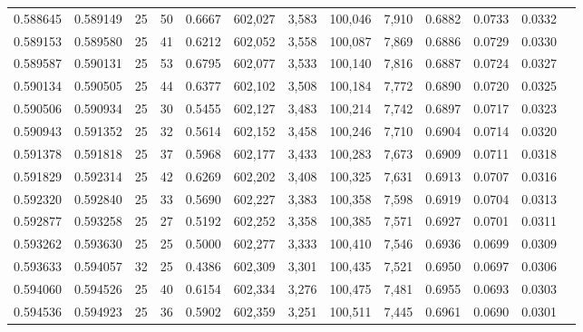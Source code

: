 \begin{tabular}{rrrrrrrrrrrrr}
0.588645 & 0.589149 &    25 &  50 &                                     0.6667 & 602,027 &   3,583 & 100,046 &   7,910 & 0.6882 & 0.0733 & 0.0332 \\
0.589153 & 0.589580 &    25 &  41 &                                     0.6212 & 602,052 &   3,558 & 100,087 &   7,869 & 0.6886 & 0.0729 & 0.0330 \\
0.589587 & 0.590131 &    25 &  53 &                                     0.6795 & 602,077 &   3,533 & 100,140 &   7,816 & 0.6887 & 0.0724 & 0.0327 \\
0.590134 & 0.590505 &    25 &  44 &                                     0.6377 & 602,102 &   3,508 & 100,184 &   7,772 & 0.6890 & 0.0720 & 0.0325 \\
0.590506 & 0.590934 &    25 &  30 &                                     0.5455 & 602,127 &   3,483 & 100,214 &   7,742 & 0.6897 & 0.0717 & 0.0323 \\
0.590943 & 0.591352 &    25 &  32 &                                     0.5614 & 602,152 &   3,458 & 100,246 &   7,710 & 0.6904 & 0.0714 & 0.0320 \\
0.591378 & 0.591818 &    25 &  37 &                                     0.5968 & 602,177 &   3,433 & 100,283 &   7,673 & 0.6909 & 0.0711 & 0.0318 \\
0.591829 & 0.592314 &    25 &  42 &                                     0.6269 & 602,202 &   3,408 & 100,325 &   7,631 & 0.6913 & 0.0707 & 0.0316 \\
0.592320 & 0.592840 &    25 &  33 &                                     0.5690 & 602,227 &   3,383 & 100,358 &   7,598 & 0.6919 & 0.0704 & 0.0313 \\
0.592877 & 0.593258 &    25 &  27 &                                     0.5192 & 602,252 &   3,358 & 100,385 &   7,571 & 0.6927 & 0.0701 & 0.0311 \\
0.593262 & 0.593630 &    25 &  25 &                                     0.5000 & 602,277 &   3,333 & 100,410 &   7,546 & 0.6936 & 0.0699 & 0.0309 \\
0.593633 & 0.594057 &    32 &  25 &                                     0.4386 & 602,309 &   3,301 & 100,435 &   7,521 & 0.6950 & 0.0697 & 0.0306 \\
0.594060 & 0.594526 &    25 &  40 &                                     0.6154 & 602,334 &   3,276 & 100,475 &   7,481 & 0.6955 & 0.0693 & 0.0303 \\
0.594536 & 0.594923 &    25 &  36 &                                     0.5902 & 602,359 &   3,251 & 100,511 &   7,445 & 0.6961 & 0.0690 & 0.0301 \\

\end{tabular}
